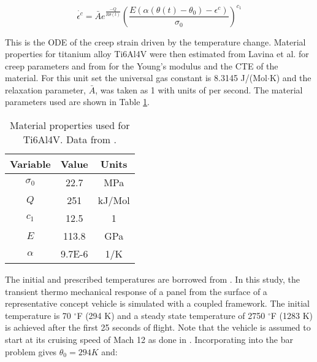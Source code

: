 \documentclass[conf]{new-aiaa}
\begin{document}
\begin{equation} \label{eq_creep_ode}
\dot{\epsilon^c} = \bar{A} e^{\frac{-Q}{R \theta(t)}} 
    \left( \frac{E ( \alpha (\theta(t) - \theta_0) - \epsilon^c)}{\sigma_0} \right)^{c_1}
\end{equation}

This is the ODE of the creep strain driven by the temperature change.
Material properties for titanium alloy Ti6Al4V were then estimated from
Lavina et al. \cite{ lavina_creep_behavior_of_Ti6Al4V_from_450C_to_600C}
for creep parameters and from \cite{
boyer_materials_properties_handbook_titanium_alloys}
for the Young's modulus and the CTE of the material.
For this unit set the universal gas constant is 8.3145 J/(Mol$\cdot$K)
and the relaxation parameter, $\bar{A}$, was taken as 1 with units of per second.
The material parameters used are shown in Table \ref{tab_material_properties}.

\begin{table}[H]
  \centering
  \caption{
    Material properties used for Ti6Al4V.
    Data from 
    \cite{ lavina_creep_behavior_of_Ti6Al4V_from_450C_to_600C,
      boyer_materials_properties_handbook_titanium_alloys}.}
  \begin{tabular}{|c|c|c|}
    \hline
    Variable & Value & Units  \\
    \hline
    $\sigma_0$ & 22.7  & MPa    \\
    $Q$      & 251     & kJ/Mol \\
    $c_1$    & 12.5    & 1      \\
    $E$      & 113.8   & GPa    \\
    $\alpha$ & 9.7E-6  & 1/K    \\
    \hline
  \end{tabular}
  \label{tab_material_properties}
\end{table}


The initial and prescribed temperatures are borrowed from 
\cite{ culler_impact_of_FTS_coupling_on_response_prediction_hypersonic_skin_panels}.
In this study, the transient thermo mechanical response of a panel from the 
surface of a representative concept vehicle is simulated with a coupled framework.
The initial temperature is 70 $^{\circ}$F (294 K) and a steady state temperature 
of 2750 $^{\circ}$F (1283 K) is achieved after the first 25 seconds of flight.
Note that the vehicle is assumed to start at its cruising speed of Mach 12
as done in \cite{ culler_impact_of_FTS_coupling_on_response_prediction_hypersonic_skin_panels}.
Incorporating into the bar problem
gives $\theta_0 = 294 K$ and:
\end{document}
